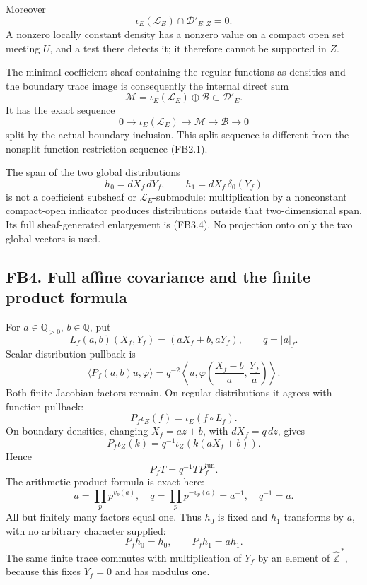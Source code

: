 Moreover \[
\iota_E(\mathscr L_E)\cap\mathscr D'_{E,Z}=0.
\tag{FB3.3}
\] A nonzero locally constant density has a nonzero value on a compact
open set meeting \(U\), and a test there detects it; it therefore cannot
be supported in \(Z\).

The minimal coefficient sheaf containing the regular functions as
densities and the boundary trace image is consequently the internal
direct sum \[
\boxed{\mathscr M
=\iota_E(\mathscr L_E)\oplus\mathscr B
\subset\mathscr D'_E.}
\tag{FB3.4}
\] It has the exact sequence \[
0\longrightarrow\iota_E(\mathscr L_E)
\longrightarrow\mathscr M
\longrightarrow\mathscr B\longrightarrow0
\tag{FB3.5}
\] split by the actual boundary inclusion. This split sequence is
different from the nonsplit function-restriction sequence (FB2.1).

The span of the two global distributions \[
h_0=dX_f\,dY_f,\qquad h_1=dX_f\,\delta_0(Y_f)
\tag{FB3.6}
\] is not a coefficient subsheaf or \(\mathscr L_E\)-submodule:
multiplication by a nonconstant compact-open indicator produces
distributions outside that two-dimensional span. Its full
sheaf-generated enlargement is (FB3.4). No projection onto only the two
global vectors is used.

\subsection{FB4. Full affine covariance and the finite product
formula}\label{fb4.-full-affine-covariance-and-the-finite-product-formula}

For \(a\in\mathbb Q_{>0}\), \(b\in\mathbb Q\), put \[
L_f(a,b)(X_f,Y_f)=(aX_f+b,aY_f),\qquad q=|a|_f.
\] Scalar-distribution pullback is \[
\langle P_f(a,b)u,\varphi\rangle
=q^{-2}\left\langle u,
\varphi\!\left(\frac{X_f-b}{a},\frac{Y_f}{a}\right)
\right\rangle.
\tag{FB4.1}
\] Both finite Jacobian factors remain. On regular distributions it
agrees with function pullback: \[
P_f\iota_E(f)=\iota_E(f\circ L_f).
\tag{FB4.2}
\] On boundary densities, changing \(X_f=az+b\), with \(dX_f=q\,dz\),
gives \[
P_f\iota_Z(k)
=q^{-1}\iota_Z(k(aX_f+b)).
\tag{FB4.3}
\] Hence \[
\boxed{P_fT=q^{-1}T P_f^{\mathrm{fun}}.}
\tag{FB4.4}
\] The arithmetic product formula is exact here: \[
a=\prod_p p^{v_p(a)},\quad
q=\prod_p p^{-v_p(a)}=a^{-1},\quad q^{-1}=a.
\tag{FB4.5}
\] All but finitely many factors equal one. Thus \(h_0\) is fixed and
\(h_1\) transforms by \(a\), with no arbitrary character supplied: \[
P_fh_0=h_0,\qquad P_fh_1=a h_1.
\tag{FB4.6}
\] The same finite trace commutes with multiplication of \(Y_f\) by an
element of \(\widehat{\mathbb Z}^{\,*}\), because this fixes \(Y_f=0\)
and has modulus one.

